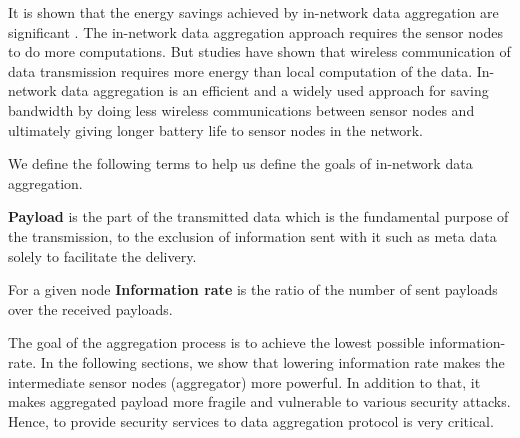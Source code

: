 	It is shown that the energy savings achieved by in-network data aggregation are significant \cite{madden2002tag}.
	The in-network data aggregation approach requires the sensor nodes to do more computations.
	But studies have shown that wireless communication of data transmission requires more energy than local computation of the data. 
	In-network data aggregation is an efficient and a widely used approach for saving bandwidth by doing less wireless communications between sensor nodes and ultimately giving longer battery life to sensor nodes in the network.

	We define the following terms to help us define the goals of in-network data aggregation.
	\begin{definition}\label{def:payload}\cite{PayloadWiKi}
		\textbf{Payload} is the part of the transmitted data which is the fundamental purpose of the transmission, to the exclusion of information sent with it such as meta data solely to facilitate the delivery.
	\end{definition}
	\begin{definition}\label{def:information-rate}
		For a given node \textbf {Information rate} is the ratio of the number of sent payloads over the received payloads.
	\end{definition}
	The goal of the aggregation process is to achieve the lowest possible information-rate.
	In the following sections, we show that lowering information rate makes the intermediate sensor nodes (aggregator) more powerful.
	In addition to that, it makes aggregated payload more fragile and vulnerable to various security attacks.
	Hence, to provide security services to data aggregation protocol is very critical. 

